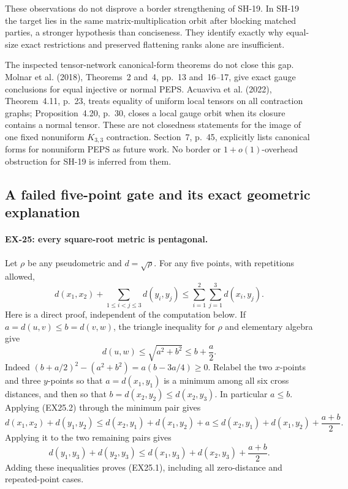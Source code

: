 These observations do not disprove a border strengthening of SH-19.
In SH-19 the target lies in the same matrix-multiplication orbit after
blocking matched parties, a stronger hypothesis than conciseness.
They identify exactly why equal-size exact restrictions and preserved
flattening ranks alone are insufficient.

The inspected tensor-network canonical-form theorems do not close this
gap. Molnar et al. (2018), Theorems~2 and~4, pp.~13 and~16--17,
give exact gauge conclusions for equal injective or normal PEPS.
Acuaviva et al. (2022), Theorem~4.11, p.~23, treats equality of
uniform local tensors on all contraction graphs; Proposition~4.20,
p.~30, closes a local gauge orbit when its closure contains a normal
tensor. These are not closedness statements for the image of one
fixed nonuniform $K_{3,3}$ contraction. Section~7, p.~45, explicitly
lists canonical forms for nonuniform PEPS as future work. No border
or $1+o(1)$-overhead obstruction for SH-19 is inferred from them.

\subsection{A failed five-point gate and its exact geometric explanation}

\paragraph{EX-25: every square-root metric is pentagonal.}
Let $\rho$ be any pseudometric and $d=\sqrt\rho$. For any five
points, with repetitions allowed,
\[
 d(x_1,x_2)+\sum_{1\le i<j\le3}d(y_i,y_j)
 \le \sum_{i=1}^2\sum_{j=1}^3d(x_i,y_j).
 \tag{EX25.1}
\]
Here is a direct proof, independent of the computation below.
If $a=d(u,v)\le b=d(v,w)$, the triangle inequality for $\rho$
and elementary algebra give
\[
 d(u,w)\le\sqrt{a^2+b^2}\le b+\frac a2.
 \tag{EX25.2}
\]
Indeed $(b+a/2)^2-(a^2+b^2)=a(b-3a/4)\ge0$.
Relabel the two $x$-points and three $y$-points so that
$a=d(x_1,y_1)$ is a minimum among all six cross distances,
and then so that $b=d(x_2,y_2)\le d(x_2,y_3)$.
In particular $a\le b$. Applying (EX25.2) through the
minimum pair gives
\[
 d(x_1,x_2)+d(y_1,y_2)
 \le d(x_2,y_1)+d(x_1,y_2)+a
 \le d(x_2,y_1)+d(x_1,y_2)+\frac{a+b}{2}.
\]
Applying it to the two remaining pairs gives
\[
 d(y_1,y_3)+d(y_2,y_3)
 \le d(x_1,y_3)+d(x_2,y_3)+\frac{a+b}{2}.
\]
Adding these inequalities proves (EX25.1), including all
zero-distance and repeated-point cases.

